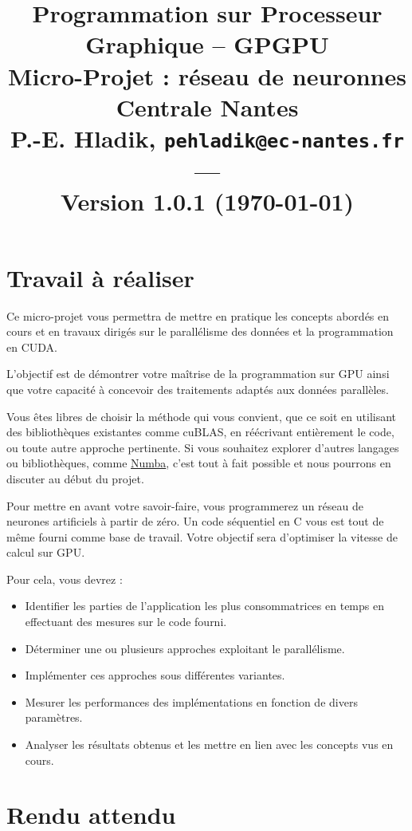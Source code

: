 \documentclass[11pt]{paper}
\title{{\Large Programmation sur Processeur Graphique -- GPGPU }\\
\vspace{-0.4em}
{\large Micro-Projet : réseau de neuronnes}\\
{\small Centrale Nantes}\\
\small P.-E. Hladik, \small{\texttt{pehladik@ec-nantes.fr}}\\
---\\
{\scriptsize  Version 1.0.1 (\today)}\\
}
\begin{document}
\maketitle

  \section*{Travail à réaliser}

Ce micro-projet vous permettra de mettre en pratique les concepts abordés en cours et en travaux dirigés sur le parallélisme des données et la programmation en CUDA.

L'objectif est de démontrer votre maîtrise de la programmation sur GPU ainsi que votre capacité à concevoir des traitements adaptés aux données parallèles.

Vous êtes libres de choisir la méthode qui vous convient, que ce soit en utilisant des bibliothèques existantes comme cuBLAS, en réécrivant entièrement le code, ou toute autre approche pertinente. Si vous souhaitez explorer d'autres langages ou bibliothèques, comme \href{https://numba.readthedocs.io/en/stable/}{Numba}, c'est tout à fait possible et nous pourrons en discuter au début du projet.\medskip

Pour mettre en avant votre savoir-faire, vous programmerez un réseau de neurones artificiels à partir de zéro. Un code séquentiel en C vous est tout de même fourni comme base de travail. Votre objectif sera d’optimiser la vitesse de calcul sur GPU.
\medskip

Pour cela, vous devrez :
\begin{itemize}
	\item Identifier les parties de l’application les plus consommatrices en temps en effectuant des mesures sur le code fourni.
	\item Déterminer une ou plusieurs approches exploitant le parallélisme.
	\item Implémenter ces approches sous différentes variantes.
	\item Mesurer les performances des implémentations en fonction de divers paramètres.
	\item Analyser les résultats obtenus et les mettre en lien avec les concepts vus en cours.
\end{itemize}
\medskip

  \section*{Rendu attendu}
\end{document}
